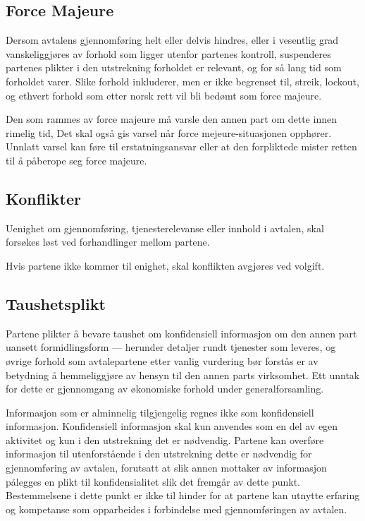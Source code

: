 \documentclass[norsk,a4paper]{article}
\begin{document}
\subsection{Force Majeure}
Dersom avtalens gjennomføring helt eller delvis hindres, eller i vesentlig grad
vanskeliggjøres av forhold som ligger utenfor partenes kontroll, suspenderes
partenes plikter i den utstrekning forholdet er relevant, og for så lang tid
som forholdet varer. Slike forhold inkluderer, men er ikke begrenset til,
streik, lockout, og ethvert forhold som etter norsk rett vil bli bedømt som
force majeure.

Den som rammes av force majeure må varsle den annen part om dette innen rimelig
tid, Det skal også gis varsel når force mejeure-situasjonen opphører. Unnlatt
varsel kan føre til erstatningsansvar eller at den forpliktede mister retten
til å påberope seg force majeure.

\subsection{Konflikter}
Uenighet om gjennomføring, tjenesterelevanse eller innhold i avtalen, skal
forsøkes løst ved forhandlinger mellom partene.

Hvis partene ikke kommer til enighet, skal konflikten avgjøres ved volgift.

\subsection{Taushetsplikt}
Partene plikter å bevare taushet om konfidensiell informasjon om den annen part
uansett formidlingsform --- herunder detaljer rundt tjenester som leveres, og
øvrige forhold som avtalepartene etter vanlig vurdering bør forstås er av
betydning å hemmeliggjøre av hensyn til den annen parts virksomhet. Ett unntak
for dette er gjennomgang av økonomiske forhold under generalforsamling.

Informasjon som er alminnelig tilgjengelig regnes ikke som konfidensiell
informasjon. Konfidensiell informasjon skal kun anvendes som en del av egen
aktivitet og kun i den utstrekning det er nødvendig. Partene kan overføre
informasjon til utenforstående i den utstrekning dette er nødvendig for
gjennomføring av avtalen, forutsatt at slik annen mottaker av informasjon
pålegges en plikt til konfidensialitet slik det fremgår av dette punkt.
Bestemmelsene i dette punkt er ikke til hinder for at partene kan utnytte
erfaring og kompetanse som opparbeides i forbindelse med gjennomføringen av
avtalen.
\end{document}
